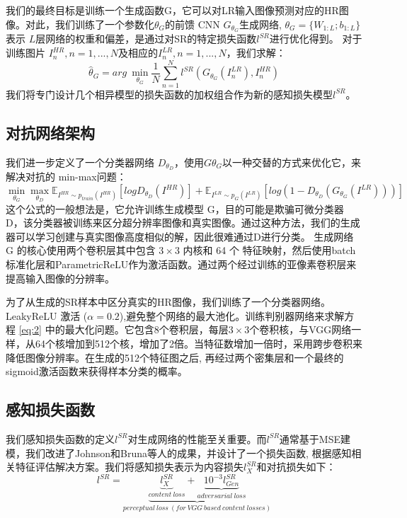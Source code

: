 \documentclass[UTF8,a4paper,10pt]{ctexart}
\begin{document}
我们的最终目标是训练一个生成函数G，它可以对LR输入图像预测对应的HR图像。对此，我们训练了一个参数化$\theta_G$的前馈 CNN $G_{\theta_G}$生成网络,
$\theta_G = \{W_{1:L};b_{1:L}\}$表示 $L$层网络的权重和偏差，是通过对SR的特定损失函数$l^{SR}$进行优化得到。
对于训练图片 $I^{HR}_n, n = 1, ..., N$及相应的$I^{LR}_n, n = 1, ..., N$，我们求解：
\begin{equation}
  \hat{\theta}_G = arg\ \mathop{min}\limits_{\theta_G} \frac{1}{N} \sum_{n = 1}^{N} l^{SR}(G_{\theta_G}(I_n^{LR}), I_n^{HR})\label{eq:1}
\end{equation}
我们将专门设计几个相异模型的损失函数的加权组合作为新的感知损失模型$l^{SR}$。

\subsection{对抗网络架构}
我们进一步定义了一个分类器网络 $D_{\theta_D}$，使用$G{\theta_G}$以一种交替的方式来优化它，来解决对抗的 min-max问题：
\begin{equation}
  \mathop{min}\limits_{\theta_G} \mathop{max}\limits_{\theta_D} \mathbb{E}_{I^{HR} \sim p_{train}(I^{HR})}[logD_{\theta_D}(I^{HR})] + \mathbb{E}_{I^{LR} \sim p_G(I^{LR})}[log(1 - D_{\theta_D}(G_{\theta_G}(I^{LR})))]\label{eq:2}
\end{equation}
这个公式的一般想法是，它允许训练生成模型 G，目的可能是欺骗可微分类器 D，该分类器被训练来区分超分辨率图像和真实图像。通过这种方法，我们的生成器可以学习创建与真实图像高度相似的解，因此很难通过D进行分类。
生成网络 G 的核心使用两个卷积层其中包含 $3 × 3$ 内核和 64 个 特征映射，然后使用batch标准化层和ParametricReLU作为激活函数。通过两个经过训练的亚像素卷积层来提高输入图像的分辨率。

为了从生成的SR样本中区分真实的HR图像，我们训练了一个分类器网络。LeakyReLU 激活 ($\alpha = 0.2$),避免整个网络的最大池化。训练判别器网络来求解方程 \ref{eq:2} 中的最大化问题。它包含8个卷积层，每层$3 × 3$个卷积核，与VGG网络一样，从64个核增加到512个核，增加了2倍。当特征数增加一倍时，采用跨步卷积来降低图像分辨率。在生成的512个特征图之后, 再经过两个密集层和一个最终的sigmoid激活函数来获得样本分类的概率。

\subsection{感知损失函数}
我们感知损失函数的定义$l^{SR}$对生成网络的性能至关重要。而$l^{SR}$通常基于MSE建模，我们改进了Johnson和Bruna等人的成果，并设计了一个损失函数, 根据感知相关特征评估解决方案。我们将感知损失表示为内容损失$l_X^{SR}$和对抗损失如下：
\begin{equation}
  l^{SR} = \underbrace{\underbrace{l_X^{SR}}_{content\ loss} + \underbrace{10^{-3} l_{Gen}^{SR}}_{adversarial\ loss}}_{perceptual\ loss\ (for\ VGG\ based\ content\ losses)}\label{eq:3}
\end{equation}
\end{document}
